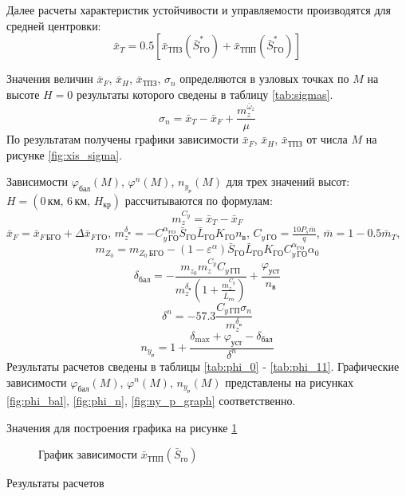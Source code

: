 Далее расчеты характеристик устойчивости и управляемости производятся
для средней центровки: 
\[
    \bar{x}_{T} = 0.5 \left[  \bar{x}_{ТПЗ}(\bar{S}_{ГО}^*) + \bar{x}_{ТПП}(\bar{S}_{ГО}^*) \right] 
\]

Значения величин $\bar{x}_F$, $\bar{x}_H$, $\bar{x}_{ТПЗ}$, $\sigma_n$ определяются в
узловых точках по $M$ на высоте $H=0$ результаты которого сведены в таблицу
\ref{tab:sigmas}. 
\[
    \sigma_n = \bar{x}_{T} - \bar{x}_{F} + \frac{m_z^{\bar{\omega}_z}}{\mu}
\]
По результатам получены графики зависимости $\bar{x}_F$, $\bar{x}_H$,
$\bar{x}_{ТПЗ}$ от числа $M$ на рисунке \ref{fig:xis_sigma}.

Зависимости $\varphi_{бал}(M)$, $\varphi^n(M)$, $n_{y_р}(M)$ для трех значений
высот: $H=(0 \, км,\, 6 \, км,\, H_{кр})$ рассчитываются по формулам:
\[
    m_z^{C_y} = \bar{x}_T - \bar{x}_F
\]
$\bar{x}_{F} = \bar{x}_{F\, БГО} + \Delta \bar{x}_{F\, ГО}$, $m_z^{\delta_в} = 
-C_{y\, {ГО}}^{\alpha_{ГО}} \bar{S}_{ГО} \bar{L}_{ГО} K_{ГО} n_в$, $C_{y\, {ГО}}
= \frac{10 P_s \bar{m}}{q}$, $\bar{m} = 1 - 0.5 \bar{m}_{T}$,
\[
    m_{Z_0} = m_{Z_0\, БГО} - 
    (1-\varepsilon^\alpha)\bar{S}_{ГО} \bar{L}_{ГО} K_{ГО} C_{y\,{ГО}}^{\alpha_{ГО}}
    \alpha_0
\]
\[
    \delta_{бал}  = - \frac{m_{z_0} m_z^{C_y} C_{y\, {ГП}}}{ m_z^{\delta_в}
    \left(1 + \frac{m_z^{C_y}}{\bar{L}_{го}}\right)} + \frac{\varphi_{уст}}{n_в}
\]
\[
    \delta^n = -57.3 \frac{C_{y\, ГП} \sigma_n}{ m_z^{\delta_в}}
\]
\[
    n_{y_р} = 1 + \frac{\delta_{\max} + \varphi_{уст} - \delta_{бал}}{\delta^n}
\]
Результаты расчетов сведены в таблицы \ref{tab:phi_0} - \ref{tab:phi_11}.
Графические зависимости $\varphi_{бал}(M)$, $\varphi^n(M)$, $n_{y_{р}}(M)$
представлены на рисунках \ref{fig:phi_bal}, \ref{fig:phi_n},
\ref{fig:ny_p_graph} соответственно.

\begin{table}[H]
    \centering
    \caption{Значения для построения графика на рисунке \ref{fig:xTP}}
    \label{tab:otn_S_go}
    
\end{table}
\begin{figure}[H]
\centering
\resizebox{.79\linewidth}{!}{}
\caption{График зависимости $\bar{x}_{ТПП}(\bar{S}_{го})$} 
\label{fig:xTP}
\end{figure}

\begin{table}[H]
    \centering
    \caption{Результаты расчетов}
    \label{tab:sigmas}
    
\end{table}

